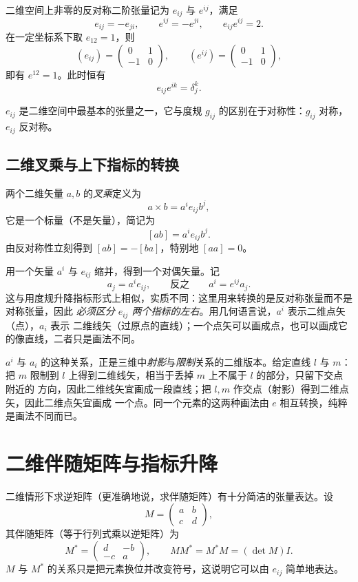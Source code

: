 \begin{definition}[二维反对称张量 $e_{ij}$]\label{def:e}
二维空间上非零的反对称二阶张量记为 $e_{ij}$ 与 $e^{ij}$，满足
\[
e_{ij}=-e_{ji},\qquad e^{ij}=-e^{ji},\qquad e_{ij}e^{ij}=2 .
\]
在一定坐标系下取 $e_{12}=1$，则
\[
(e_{ij})=\begin{pmatrix}0&1\\-1&0\end{pmatrix},\qquad
(e^{ij})=\begin{pmatrix}0&1\\-1&0\end{pmatrix},
\]
即有 $e^{12}=1$。此时恒有
\[
e_{ij}e^{ik}=\delta^k_j .
\]
\end{definition}

$e_{ij}$ 是二维空间中最基本的张量之一，它与度规 $g_{ij}$ 的区别在于对称性：$g_{ij}$ 对称，
$e_{ij}$ 反对称。

\subsection{二维叉乘与上下指标的转换}

\begin{definition}[二维叉乘]
两个二维矢量 $a,b$ 的\emph{叉乘}定义为
\[
a\times b=a^ie_{ij}b^j ,
\]
它是一个标量（不是矢量），简记为
\[
[ab]=a^ie_{ij}b^j .
\]
由反对称性立刻得到 $[ab]=-[ba]$，特别地 $[aa]=0$。
\end{definition}

用一个矢量 $a^i$ 与 $e_{ij}$ 缩并，得到一个对偶矢量。记
\[
a_j=a^ie_{ij},\qquad\text{反之}\qquad a^i=e^{ij}a_j .
\]
这与用度规升降指标形式上相似，实质不同：这里用来转换的是反对称张量而不是对称张量，因此
\emph{必须区分 $e_{ij}$ 两个指标的左右}。用几何语言说，$a^i$ 表示二维点矢（点），$a_i$ 表示
二维线矢（过原点的直线）；一个点矢可以画成点，也可以画成它的像直线，二者只是画法不同。

$a^i$ 与 $a_i$ 的这种关系，正是三维中\emph{射影}与\emph{限制}关系的二维版本。给定直线 $l$ 与
$m$：把 $m$ 限制到 $l$ 上得到二维线矢，相当于丢掉 $m$ 上不属于 $l$ 的部分，只留下交点附近的
方向，因此二维线矢宜画成一段直线；把 $l,m$ 作交点（射影）得到二维点矢，因此二维点矢宜画成
一个点。同一个元素的这两种画法由 $e$ 相互转换，纯粹是画法不同而已。

\section{二维伴随矩阵与指标升降}

二维情形下求逆矩阵（更准确地说，求伴随矩阵）有十分简洁的张量表达。设
\[
M=\begin{pmatrix}a&b\\c&d\end{pmatrix},
\]
其伴随矩阵（等于行列式乘以逆矩阵）为
\[
M^*=\begin{pmatrix}d&-b\\-c&a\end{pmatrix},\qquad MM^*=M^*M=(\det M)I .
\]
$M$ 与 $M^*$ 的关系只是把元素换位并改变符号，这说明它可以由 $e_{ij}$ 简单地表达。

